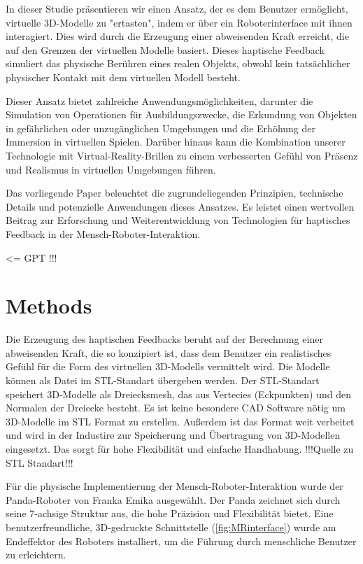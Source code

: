 \documentclass[conference]{IEEEtran}
\begin{document}
In dieser Studie präsentieren wir einen Ansatz, der es dem Benutzer ermöglicht, virtuelle 3D-Modelle zu "ertasten", indem er über ein Roboterinterface mit ihnen interagiert. Dies wird durch die Erzeugung einer abweisenden Kraft erreicht, die auf den Grenzen der virtuellen Modelle basiert. Dieses haptische Feedback simuliert das physische Berühren eines realen Objekts, obwohl kein tatsächlicher physischer Kontakt mit dem virtuellen Modell besteht. 

Dieser Ansatz bietet zahlreiche Anwendungsmöglichkeiten, darunter die Simulation von Operationen für Ausbildungszwecke, die Erkundung von Objekten in gefährlichen oder unzugänglichen Umgebungen und die Erhöhung der Immersion in virtuellen Spielen. Darüber hinaus kann die Kombination unserer Technologie mit Virtual-Reality-Brillen zu einem verbesserten Gefühl von Präsenz und Realismus in virtuellen Umgebungen führen.

Das vorliegende Paper beleuchtet die zugrundeliegenden Prinzipien, technische Details und potenzielle Anwendungen dieses Ansatzes. Es leistet einen wertvollen Beitrag zur Erforschung und Weiterentwicklung von Technologien für haptisches Feedback in der Mensch-Roboter-Interaktion.

<= GPT !!!

\section{Methods}
Die Erzeugung des haptischen Feedbacks beruht auf der Berechnung einer abweisenden Kraft, die so konzipiert ist, dass dem Benutzer ein realistisches Gefühl für die Form des virtuellen 3D-Modells vermittelt wird. Die Modelle können als Datei im STL-Standart übergeben werden. Der STL-Standart speichert 3D-Modelle als Dreiecksmesh, das aus Vertecies (Eckpunkten) und den Normalen der Dreiecke besteht. Es ist keine besondere CAD Software nötig um 3D-Modelle im STL Format zu erstellen. Außerdem ist das Format weit verbeitet und wird in der Industire zur Speicherung und Übertragung von 3D-Modellen eingesetzt. Das sorgt für hohe Flexibilität 
und einfache Handhabung. !!!Quelle zu STL Standart!!!

Für die physische Implementierung der Mensch-Roboter-Interaktion wurde der Panda-Roboter von Franka Emika ausgewählt. Der Panda zeichnet sich durch seine 7-achsige Struktur aus, die hohe Präzision und Flexibilität bietet. Eine benutzerfreundliche, 3D-gedruckte Schnittstelle (\ref{fig:MRinterface}) wurde am Endeffektor des Roboters installiert, um die Führung durch menschliche Benutzer zu erleichtern.  
\end{document}
